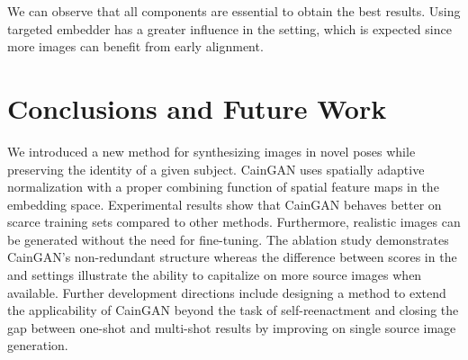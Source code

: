 \documentclass[11pt,a4paper]{article}
\begin{document}
We can observe that all components are essential to obtain the best results. Using targeted embedder has a greater influence in the  setting, which is expected since more images can benefit from early alignment.

\section{Conclusions and Future Work}
\label{sec:conclusion}
We introduced a new method for synthesizing images in novel poses while preserving the identity of a given subject. CainGAN  uses spatially adaptive normalization with a proper combining function of spatial feature maps in the embedding space. Experimental results show that CainGAN behaves better on scarce training sets compared to other methods. Furthermore, realistic images can be generated without the need for fine-tuning. The ablation study demonstrates CainGAN's non-redundant structure whereas the difference between scores in the  and  settings illustrate the ability to capitalize on more source images when available.
Further development directions include designing a method to extend the applicability of CainGAN beyond the task of self-reenactment and closing the gap between one-shot and multi-shot results by improving on single source image generation.
\end{document}
